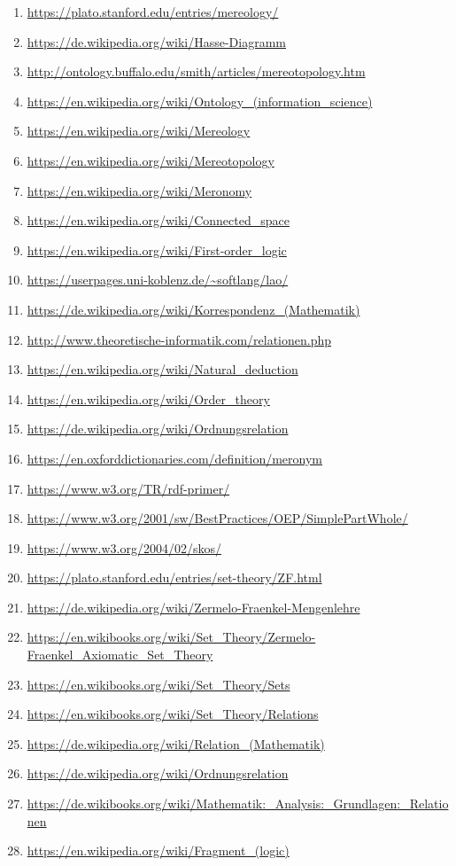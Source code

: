 \documentclass[runningheads,a4paper]{llncs}
\begin{document}
\newcommand{\urlitem}[1]{\item\url{#1}}

\begin{enumerate}
\urlitem{https://plato.stanford.edu/entries/mereology/}
\urlitem{https://de.wikipedia.org/wiki/Hasse-Diagramm}
\urlitem{http://ontology.buffalo.edu/smith/articles/mereotopology.htm}
\urlitem{https://en.wikipedia.org/wiki/Ontology_(information_science)}
\urlitem{https://en.wikipedia.org/wiki/Mereology}
\urlitem{https://en.wikipedia.org/wiki/Mereotopology}
\urlitem{https://en.wikipedia.org/wiki/Meronomy}
\urlitem{https://en.wikipedia.org/wiki/Connected_space}
\urlitem{https://en.wikipedia.org/wiki/First-order_logic} %
\urlitem{https://userpages.uni-koblenz.de/~softlang/lao/}
\urlitem{https://de.wikipedia.org/wiki/Korrespondenz_(Mathematik)}
\urlitem{http://www.theoretische-informatik.com/relationen.php}
\urlitem{https://en.wikipedia.org/wiki/Natural_deduction}
\urlitem{https://en.wikipedia.org/wiki/Order_theory}
\urlitem{https://de.wikipedia.org/wiki/Ordnungsrelation}
\urlitem{https://en.oxforddictionaries.com/definition/meronym}
\urlitem{https://www.w3.org/TR/rdf-primer/}
\urlitem{https://www.w3.org/2001/sw/BestPractices/OEP/SimplePartWhole/}
\urlitem{https://www.w3.org/2004/02/skos/}
\urlitem{https://plato.stanford.edu/entries/set-theory/ZF.html}
\urlitem{https://de.wikipedia.org/wiki/Zermelo-Fraenkel-Mengenlehre}
\urlitem{https://en.wikibooks.org/wiki/Set_Theory/Zermelo-Fraenkel_Axiomatic_Set_Theory}
\urlitem{https://en.wikibooks.org/wiki/Set_Theory/Sets}
\urlitem{https://en.wikibooks.org/wiki/Set_Theory/Relations}
\urlitem{https://de.wikipedia.org/wiki/Relation_(Mathematik)}
\urlitem{https://de.wikipedia.org/wiki/Ordnungsrelation}
\urlitem{https://de.wikibooks.org/wiki/Mathematik:_Analysis:_Grundlagen:_Relationen}
\urlitem{https://en.wikipedia.org/wiki/Fragment_(logic)}
\end{enumerate}





{}
\end{document}
